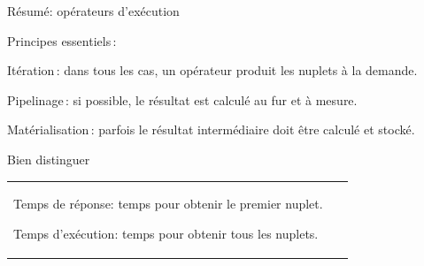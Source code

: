 \begin{frame}{Résumé: opérateurs d'exécution}

Principes essentiels\,:

\begin{redlist}
  \item \alert{Itération}\,: dans tous
     les cas, un opérateur produit les nuplets
      à la demande.
      
   \item \alert{Pipelinage}\,: si possible, le résultat
      est calculé au fur et à mesure.
      
         \item \alert{Matérialisation}\,: parfois
         le résultat intermédiaire doit être calculé et stocké.
         

\end{redlist}

\vfill

Bien distinguer

\begin{tabular}{p{9cm}p{5cm}}
\begin{redbullet}
  \item \alert{Temps de réponse}: temps pour obtenir le premier nuplet.
  \item \alert{Temps d'exécution}: temps pour obtenir tous les nuplets.  
\end{redbullet}
&
~
\end{tabular}





\end{frame}

